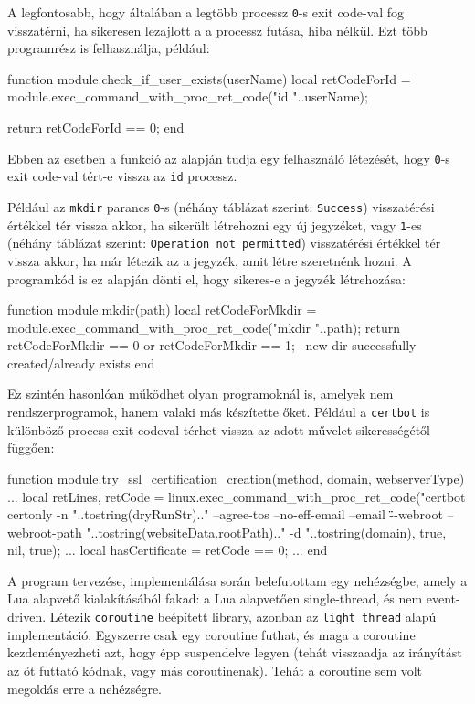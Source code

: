 A legfontosabb, hogy általában a legtöbb processz \texttt{0}-s exit code-val fog visszatérni, ha sikeresen lezajlott a a processz futása, hiba nélkül. Ezt több programrész is felhasználja, például:

\begin{lua}
function module.check_if_user_exists(userName)
    local retCodeForId = module.exec_command_with_proc_ret_code("id "..userName);

    return retCodeForId == 0;
end
\end{lua}

Ebben az esetben a \texttt{} funkció az alapján tudja egy felhasználó létezését, hogy \texttt{0}-s exit code-val tért-e vissza az \texttt{id} processz.

Például az \texttt{mkdir} parancs \texttt{0}-s (néhány táblázat szerint: \texttt{Success}) visszatérési értékkel tér vissza akkor, ha sikerült létrehozni egy új jegyzéket, vagy \texttt{1}-es (néhány táblázat szerint: \texttt{Operation not permitted}) visszatérési értékkel tér vissza akkor, ha már létezik az a jegyzék, amit létre szeretnénk hozni. A programkód is ez alapján dönti el, hogy sikeres-e a jegyzék létrehozása:
\begin{lua}
function module.mkdir(path)
    local retCodeForMkdir = module.exec_command_with_proc_ret_code("mkdir "..path);
    return retCodeForMkdir == 0 or retCodeForMkdir == 1; --new dir successfully created/already exists
end
\end{lua}

Ez szintén hasonlóan működhet olyan programoknál is, amelyek nem rendszerprogramok, hanem valaki más készítette őket. Például a \texttt{certbot} is különböző process exit codeval térhet vissza az adott művelet sikerességétől függően:
\begin{lua}
function module.try_ssl_certification_creation(method, domain, webserverType)
	...
	local retLines, retCode = linux.exec_command_with_proc_ret_code("certbot certonly -n "..tostring(dryRunStr).." --agree-tos --no-eff-email --email \"\" --webroot --webroot-path "..tostring(websiteData.rootPath).." -d "..tostring(domain), true, nil, true);
	...
	local hasCertificate = retCode == 0;
	...
end
\end{lua}

\pagebreak
{}

A program tervezése, implementálása során belefutottam egy nehézségbe, amely a Lua alapvető kialakításából fakad: a Lua alapvetően single-thread, és nem event-driven. Létezik \texttt{coroutine} beépített library, azonban az \texttt{light thread} alapú implementáció. Egyszerre csak egy coroutine futhat, és maga a coroutine kezdeményezheti azt, hogy épp suspendelve legyen (tehát visszaadja az irányítást az őt futtató kódnak, vagy más coroutinenak). Tehát a coroutine sem volt megoldás erre a nehézségre.


